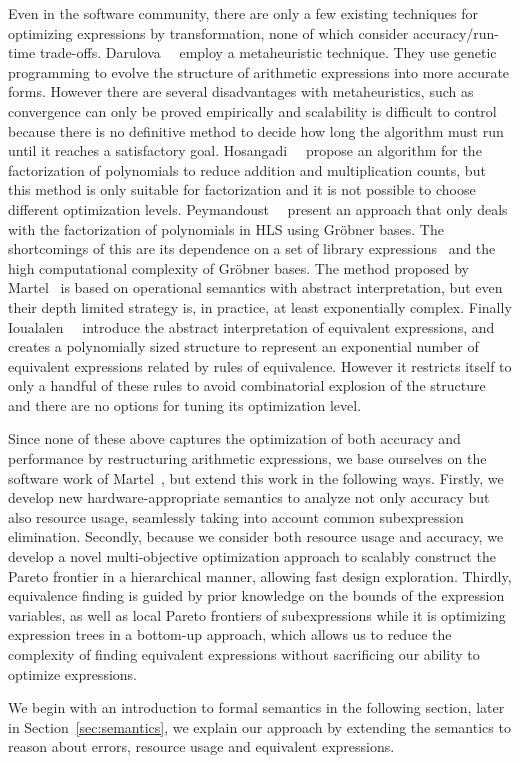 Even in the software community, there are only a few existing techniques
for optimizing expressions by transformation, none of which consider
accuracy/run-time trade-offs. Darulova~\etal~\cite{darulova} employ a
metaheuristic technique. They use genetic programming to evolve the structure
of arithmetic expressions into more accurate forms. However there are several
disadvantages with metaheuristics, such as convergence can only be proved
empirically and scalability is difficult to control because there is no
definitive method to decide how long the algorithm must run until it reaches a
satisfactory goal. Hosangadi~\etal~\cite{hosangadi} propose an algorithm for
the factorization of polynomials to reduce addition and multiplication counts,
but this method is only suitable for factorization and it is not possible to
choose different optimization levels. Peymandoust~\etal~\cite{peymandoust}
present an approach that only deals with the factorization of polynomials
in HLS using Gr\"obner bases. The shortcomings of this are its dependence
on a set of library expressions~\cite{hosangadi} and the high computational
complexity of Gr\"obner bases. The method proposed by Martel~\cite{martel07}
is based on operational semantics with abstract interpretation, but even
their depth limited strategy is, in practice, at least exponentially complex.
Finally Ioualalen~\etal~\cite{ioualalen} introduce the abstract interpretation
of equivalent expressions, and creates a polynomially sized structure to
represent an exponential number of equivalent expressions related by rules of
equivalence. However it restricts itself to only a handful of these rules to
avoid combinatorial explosion of the structure and there are no options for
tuning its optimization level.

Since none of these above captures the optimization of both accuracy and
performance by restructuring arithmetic expressions, we base ourselves on the
software work of Martel~\cite{martel07}, but extend this work in the following
ways. Firstly, we develop new hardware-appropriate semantics to analyze not
only accuracy but also resource usage, seamlessly taking into account common
subexpression elimination. Secondly, because we consider both resource usage
and accuracy, we develop a novel multi-objective optimization approach to
scalably construct the Pareto frontier in a hierarchical manner, allowing fast
design exploration. Thirdly, equivalence finding is guided by prior knowledge
on the bounds of the expression variables, as well as local Pareto frontiers of
subexpressions while it is optimizing expression trees in a bottom-up approach,
which allows us to reduce the complexity of finding equivalent expressions
without sacrificing our ability to optimize expressions.

We begin with an introduction to formal semantics in the following section,
later in Section~\ref{sec:semantics}, we explain our approach by extending the
semantics to reason about errors, resource usage and equivalent expressions.
